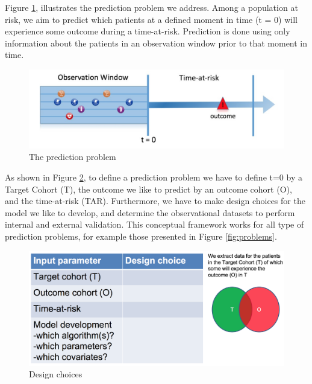 \documentclass[]{book}
\begin{document}
Figure \ref{fig:figure1}, illustrates the prediction problem we address.
Among a population at risk, we aim to predict which patients at a
defined moment in time (t = 0) will experience some outcome during a
time-at-risk. Prediction is done using only information about the
patients in an observation window prior to that moment in time.

\begin{figure}
\centering
\includegraphics{images/PatientLevelPrediction/Figure1.png}
\caption{\label{fig:figure1}The prediction problem}
\end{figure}

As shown in Figure \ref{fig:studydesign}, to define a prediction problem
we have to define t=0 by a Target Cohort (T), the outcome we like to
predict by an outcome cohort (O), and the time-at-risk (TAR).
Furthermore, we have to make design choices for the model we like to
develop, and determine the observational datasets to perform internal
and external validation. This conceptual framework works for all type of
prediction problems, for example those presented in Figure
\ref{fig:problems}.

\begin{figure}
\centering
\includegraphics{images/PatientLevelPrediction/studydesign.png}
\caption{\label{fig:studydesign}Design choices}
\end{figure}
\end{document}
